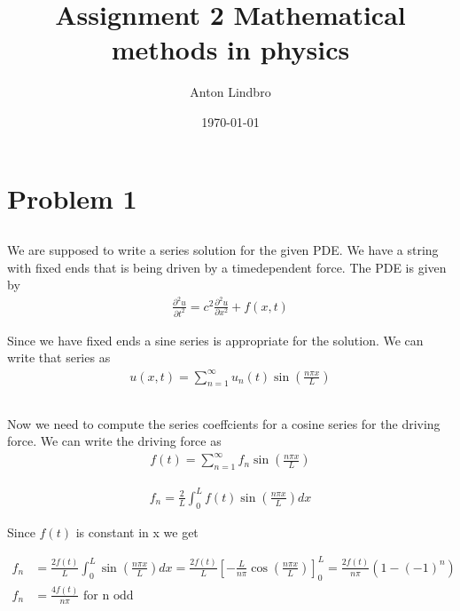 \documentclass[a4paper]{article}
\title{Assignment 2 Mathematical methods in physics}
\author{Anton Lindbro}
\date{\today}
\begin{document}
\maketitle

\section{Problem 1}

\subsection{}

We are supposed to write a series solution for the given PDE. We have a string with fixed ends that is being driven by a timedependent force. The PDE is given by   
\begin{align*}
    \frac{\partial^2 u}{\partial t^2} = c^2 \frac{\partial^2 u}{\partial x^2} + f(x,t)
\end{align*}

Since we have fixed ends a sine series is appropriate for the solution. We can write that series as
\begin{align*}
    u(x,t) = \sum_{n=1}^{\infty} u_n(t) \sin \left ( \frac{n\pi x}{L} \right )
\end{align*}

\subsection{}

Now we need to compute the series coeffcients for a cosine series for the driving force. We can write the driving force as
\begin{align*}
    f(t) = \sum_{n=1}^{\infty} f_n \sin \left ( \frac{n\pi x}{L} \right )
\end{align*}

\begin{align*}
    f_n = \frac{2}{L} \int_{0}^{L} f(t) \sin \left ( \frac{n\pi x}{L} \right ) dx
\end{align*}

Since $f(t)$ is constant in x we get

\begin{align*}
    f_n &= \frac{2f(t)}{L} \int_{0}^{L} \sin \left ( \frac{n\pi x}{L} \right ) dx = \frac{2f(t)}{L} \left [ -\frac{L}{n\pi} \cos \left ( \frac{n\pi x}{L} \right ) \right ]_{0}^{L} = \frac{2f(t)}{n\pi} \left ( 1 - (-1)^n \right )\\
    f_n &= \frac{4f(t)}{n\pi} \text{ for n odd}
\end{align*}
\end{document}
